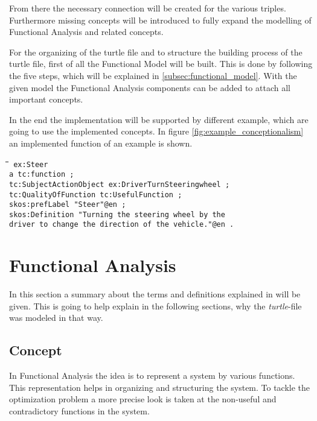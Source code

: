 \documentclass[11pt,a4paper]{article}
\newenvironment{code}{\tt \begin{tabbing}
\hskip12pt\=\hskip12pt\=\hskip12pt\=\hskip12pt\=\hskip5cm\=\hskip5cm\=\kill}
{\end{tabbing}}
\begin{document}
From there the necessary connection will be created for the various triples.
Furthermore missing concepts will be introduced to fully expand the modelling
of Functional Analysis and related concepts.

For the organizing of the turtle file and to structure the building process of
the turtle file, first of all the Functional Model will be built.  This is
done by following the five steps, which will be explained in
\ref{subsec:functional_model}.  With the given model the Functional Analysis
components can be added to attach all important concepts.

In the end the implementation will be supported by different example, which
are going to use the implemented concepts.  In figure
\ref{fig:example_conceptionalism} an implemented function of an example is
shown.

\begin{code}\tt
  ex:Steer\\
  \> a tc:function ;\\
  \> tc:SubjectActionObject ex:DriverTurnSteeringwheel ;\\
  \> tc:QualityOfFunction tc:UsefulFunction ;\\
  \> skos:prefLabel "Steer"@en ;\\
  \> skos:Definition "Turning the steering wheel by the\\
  \> \> driver to change the direction of the vehicle."@en .
\end{code}

\section{Functional Analysis}
\label{sec:functional_analysis}

In this section a summary about the terms and definitions explained in
\cite{KS} will be given.  This is going to help explain in the following
sections, why the \emph{turtle}-file was modeled in that way.

\subsection{Concept}

In Functional Analysis the idea is to represent a system by various functions.
This representation helps in organizing and structuring the system.  To tackle
the optimization problem a more precise look is taken at the non-useful and
contradictory functions in the system.
\end{document}
